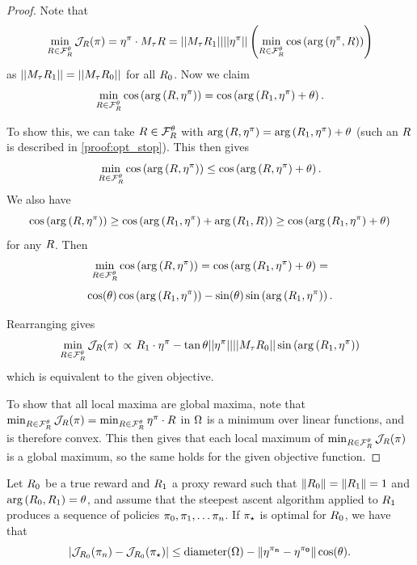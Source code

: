 \begin{proof}
Note that $$\min_{R \in \mathcal{F}_{R}^\theta}\mathcal{J}_{R}(\pi) = \mathbf{\eta^{\pi}} \cdot M_\tau R = ||M_\tau R_1||||\mathbf{\eta^{\pi}}||\left(\min_{R \in \mathcal{F}_{R}^\theta}\cos\left(\mathrm{arg}\left({\mathbf{\eta^{\pi}}}, {R}\right)\right)\right)$$
as $||M_\tau R_1|| = ||M_\tau R_0||$ for all $R_0$. Now we claim
$$\min_{R \in \mathcal{F}_{R}^\theta}\cos\left(\mathrm{arg}\left({R}, {\mathbf{\eta^{\pi}}}\right)\right) = \cos\left(\mathrm{arg}\left({R_1}, { \mathbf{\eta^{\pi}}}\right)+\theta\right).$$


To show this, we can take $R \in \mathcal{F}_{R}^\theta$ with $\mathrm{arg}\left({R}, {\mathbf{\eta^{\pi}}}\right) = \mathrm{arg}\left({R_1}, {\mathbf{\eta^{\pi}}}\right)+\theta$ (such an $R$ is described in \cref{proof:opt_stop}). This then gives $$\min_{R \in \mathcal{F}_{R}^\theta}\cos\left(\mathrm{arg}\left({R}, {\mathbf{\eta^{\pi}}}\right)\right) \leq \cos\left(\mathrm{arg}\left({R}, { \mathbf{\eta^{\pi}}}\right)+\theta\right).$$ We also have $$\cos\left(\mathrm{arg}\left({R}, {\mathbf{\eta^{\pi}}}\right)\right) \geq \cos\left(\mathrm{arg}\left({R_1}, { \mathbf{\eta^{\pi}}}\right)+\mathrm{arg}\left({R_1}, { R}\right)\right) \geq \cos\left(\mathrm{arg}\left({R_1}, { \mathbf{\eta^{\pi}}}\right)+\theta\right)$$
for any $R$.
Then $$\min_{R \in \mathcal{F}_{R}^\theta}\cos\left(\mathrm{arg}\left({R}, {\mathbf{\eta^{\pi}}}\right)\right) = \cos\left(\mathrm{arg}\left({R_1}, { \mathbf{\eta^{\pi}}}\right)+\theta\right) =$$$$ \cos(\theta)\cos\left(\mathrm{arg}\left({R_1}, {\mathbf{\eta^{\pi}}}\right)\right)-\sin(\theta)\sin\left(\mathrm{arg}\left({R_1}, { \mathbf{\eta^{\pi}}}\right)\right).$$

Rearranging gives $$\left.\min_{R \in \mathcal{F}_{R}^\theta} \mathcal{J}_{R}(\pi)\right. \propto 
 \left.R_1 \cdot \mathbf{\eta^{\pi}}-\tan{\theta}||\mathbf{\eta^{\pi}}||||M_\tau R_0||\sin\left(\mathrm{arg}\left({R_1}, {\mathbf{\eta^{\pi}}}\right)\right)\right.$$ which is equivalent to the given objective.

To show that all local maxima are global maxima, note that $\min_{R \in \mathcal{F}_{R}^\theta} \mathcal{J}_{R}(\pi) = \min_{R \in \mathcal{F}_{R}^\theta} \mathbf{\eta^{\pi}} \cdot R$ in $\Omega$ is a minimum over linear functions, and is therefore convex. This then gives that each local maximum of $\min_{R \in \mathcal{F}_{R}^\theta} \mathcal{J}_R(\pi)$ is a global maximum, so the same holds for the given objective function.
\end{proof}
\begin{proposition}%
Let $R_0$ be a true reward and $R_1$ a proxy reward such that $\|R_0\| = \|R_1\| = 1$ and $\mathrm{arg}\left({R_0}, {R_1}\right) = \theta$, and assume that the steepest ascent algorithm applied to $R_1$ produces a sequence of policies $\pi_0, \pi_1, \dots \pi_n$. If $\pi_\star$ is optimal for $R_0$, we have that
$$
|\mathcal{J}_{R_0}(\pi_{n}) - \mathcal{J}_{R_0}(\pi_\star)| \leq 
\mathrm{diameter}(\Omega) - \| \mathbf{\eta^{\pi_{n}}} - \mathbf{\eta^{\pi_{0}}}\|\cos(\theta).
$$
\end{proposition}

